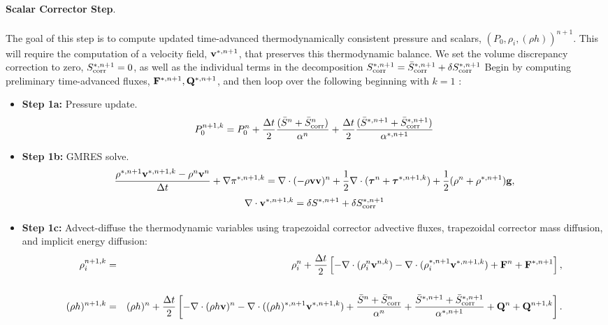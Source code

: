 \documentclass[final]{siamltex}
\def\Fb {{\bf F}}
\def\gb {{\bf g}}
\def\Qb {{\bf Q}}
\def\vb {{\bf v}}
\def\taub   {\boldsymbol{\tau}}
\begin{document}
{\bf Scalar Corrector Step}.\\ \\
The goal of this step is to compute updated time-advanced thermodynamically consistent 
pressure and scalars, $(P_0,\rho_i,(\rho h))^{n+1}$.  This will require the computation
of a velocity field, $\vb^{*,n+1}$, that preserves this thermodynamic balance.
We set the volume discrepancy correction to zero,
$S_{\rm corr}^{*,n+1} = 0$, as well as the individual terms in the decomposition
$S_{\rm corr}^{*,n+1} = \bar{S}_{\rm corr}^{*,n+1} + \delta S_{\rm corr}^{*,n+1}$
Begin by computing preliminary time-advanced fluxes, $\Fb^{*,n+1}, \Qb^{*,n+1}$,
and then loop over the following beginning with $k=1$ :\\
\begin{itemize}
\item {\bf Step 1a:} Pressure update.
\begin{equation}
P_0^{n+1,k} = P_0^n + \frac{\Delta t}{2}\frac{(\bar{S}^n + \bar{S}_{\rm corr}^n)}{\alpha^n} + \frac{\Delta t}{2}\frac{(\bar{S}^{*,n+1} + \bar{S}_{\rm corr}^{*,n+1})}{\alpha^{*,n+1}}
\end{equation}
\item {\bf Step 1b:} GMRES solve.
\begin{equation}
\frac{\rho^{*,n+1}\vb^{*,n+1,k} - \rho^n\vb^n}{\Delta t} + \nabla\pi^{*,n+1,k} = \nabla\cdot(-\rho\vb\vb)^n + \frac{1}{2}\nabla\cdot(\taub^n + \taub^{*,n+1,k}) + \frac{1}{2}(\rho^n + \rho^{*,n+1})\gb,
\end{equation}
\begin{equation}
\nabla\cdot\vb^{*,n+1,k} = \delta S^{*,n+1} + \delta S_{\rm corr}^{*,n+1}
\end{equation}
\item {\bf Step 1c:} Advect-diffuse the thermodynamic variables using trapezoidal corrector advective fluxes,
trapezoidal corrector mass diffusion, and implicit energy diffusion:
\begin{eqnarray}
\rho_i^{n+1,k} &=& \rho_i^n + \frac{\Delta t}{2}\left[-\nabla\cdot(\rho_i^n\vb^{n,k}) -\nabla\cdot(\rho_i^{*,n+1}\vb^{*,n+1,k}) + \Fb^n + \Fb^{*,n+1}\right],\nonumber \\
\\
(\rho h)^{n+1,k} &=& (\rho h)^n + \frac{\Delta t}{2}\left[-\nabla\cdot(\rho h\vb)^n -\nabla\cdot((\rho h)^{*,n+1}\vb^{*,n+1,k}) + \frac{\bar{S}^n + \bar{S}_{\rm corr}^n}{\alpha^n} + \frac{\bar{S}^{*,n+1}+ \bar{S}_{\rm corr}^{*,n+1}}{\alpha^{*,n+1}} + \Qb^n + \Qb^{n+1,k}\right].\nonumber\\

\end{eqnarray}
\end{itemize}
\end{document}
